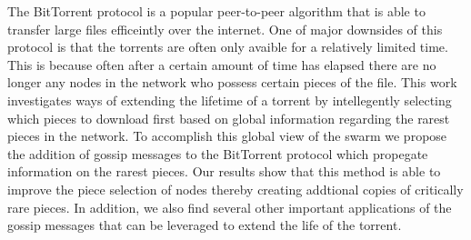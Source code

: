 The BitTorrent protocol is a popular peer-to-peer algorithm that is able to 
transfer large files efficeintly over the internet. One of major
downsides of this protocol is that the torrents are often only avaible
for a relatively limited time. This is because often after a certain
amount of time has elapsed there are no longer any nodes in the
network who possess certain pieces of the file. This work
investigates ways of extending the lifetime of a torrent by
intellegently selecting which pieces to download first based on global
information regarding the rarest pieces in the network. To accomplish
this global view of the swarm we propose the addition of gossip
messages to the BitTorrent protocol which propegate information on the
rarest pieces. Our results show that this method is able to improve
the piece selection of nodes thereby creating addtional copies of
critically rare pieces. In addition, we also find several other
important applications of the gossip messages that can be leveraged to
extend the life of the torrent. 
